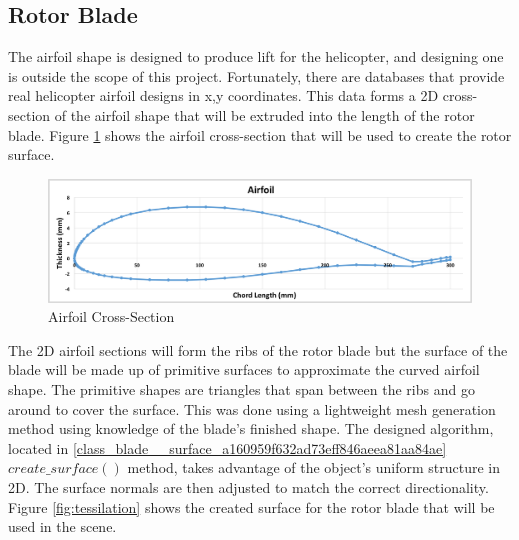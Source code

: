 \subsection{Rotor Blade}
The airfoil shape is designed to produce lift for the helicopter, and designing one is outside the scope of this project. Fortunately, there are databases that provide real helicopter airfoil designs in x,y coordinates. This data forms a 2D cross-section of the airfoil shape that will be extruded into the length of the rotor blade. Figure \ref{fig:airfoil} shows the airfoil cross-section that will be used to create the rotor surface. 

\begin{figure}
	\begin{center}
		\includegraphics[width=14cm]{images/radio_propagation/2d_airfoil.png}
		\caption{Airfoil Cross-Section}
		\label{fig:airfoil}
	\end{center}
\end{figure}

The 2D airfoil sections will form the ribs of the rotor blade but the surface of the blade will be made up of primitive surfaces to approximate the curved airfoil shape. The primitive shapes are triangles that span between the ribs and go around to cover the surface. This was done using a lightweight mesh generation method using knowledge of the blade's finished shape. The designed algorithm, located in \ref{class_blade__surface_a160959f632ad73eff846aeea81aa84ae} $create\_surface()$ method, takes advantage of the object's uniform structure in 2D. The surface normals are then adjusted to match the correct directionality. Figure \ref{fig:tessilation} shows the created surface for the rotor blade that will be used in the scene.

